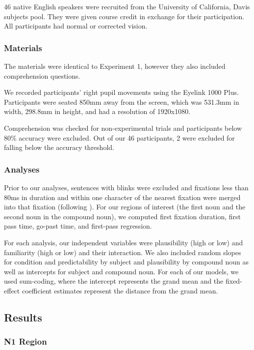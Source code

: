 \documentclass[
  12pt,
  letterpaper,
]{scrreport}
\begin{document}
46 native English speakers were recruited from the University of
California, Davis subjects pool. They were given course credit in
exchange for their participation. All participants had normal or
corrected vision.

\subsubsection{Materials}\label{materials}

The materials were identical to Experiment 1, however they also included
comprehension questions.

We recorded participants' right pupil movements using the Eyelink 1000
Plus. Participants were seated 850mm away from the screen, which was
531.3mm in width, 298.8mm in height, and had a resolution of 1920x1080.

Comprehension was checked for non-experimental trials and participants
below 80\% accuracy were excluded. Out of our 46 participants, 2 were
excluded for falling below the accuracy threshold.

\subsubsection{Analyses}\label{analyses}

Prior to our analyses, sentences with blinks were excluded and fixations
less than 80ms in duration and within one character of the nearest
fixation were merged into that fixation (following
). For
our regions of interest (the first noun and the second noun in the
compound noun), we computed first fixation duration, first pass time,
go-past time, and first-pass regression.

For each analysis, our independent variables were plausibility (high or
low) and familiarity (high or low) and their interaction. We also
included random slopes for condition and predictability by subject and
plausibility by compound noun as well as intercepts for subject and
compound noun. For each of our models, we used sum-coding, where the
intercept represents the grand mean and the fixed-effect coefficient
estimates represent the distance from the grand mean.

\subsection{Results}\label{results-2}

\subsubsection{N1 Region}\label{n1-region}
\end{document}
